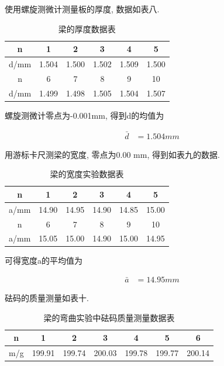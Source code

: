 \documentclass[a4paper,10pt,notitlepage]{article}
\begin{document}
	使用螺旋测微计测量板的厚度, 数据如表八. \\
	
\begin{center}

	\begin{longtable}{|c|c|c|c|c|c|}
	\caption{梁的厚度数据表} \\
	\hline
	n & 1 & 2 & 3 & 4 & 5 \\
	\hline
	d/mm & 1.504 & 1.500 & 1.502 & 1.509 & 1.500 \\
	\hline
	\hline
	n & 6 & 7 & 8 & 9 & 10 \\
	\hline
	d/mm & 1.499 & 1.498 & 1.505 & 1.504 & 1.507 \\
	\hline
	\end{longtable}

\end{center}

	螺旋测微计零点为-0.001mm, 得到d的均值为
	
\begin{align*}
	\bar{d} &= 1.504 mm
\end{align*}

	用游标卡尺测梁的宽度, 零点为0.00 mm, 得到如表九的数据. \\
	
\begin{center}

	\begin{longtable}{|c|c|c|c|c|c|}
	\caption{梁的宽度实验数据表} \\
	\hline
	n & 1 & 2 & 3 & 4 & 5 \\
	\hline
	a/mm & 14.90 & 14.95 & 14.90 & 14.85 & 15.00 \\
	\hline
	\hline
	n & 6 & 7 & 8 & 9 & 10 \\
	\hline
	a/mm & 15.05 & 15.00 & 14.90 & 15.00 & 14.95 \\
	\hline
	\end{longtable}

\end{center}

	可得宽度a的平均值为

\begin{align*}
	\bar{a} &= 14.95 mm
\end{align*}

	砝码的质量测量如表十. \\
	
\begin{center}

	\begin{longtable}{|c|c|c|c|c|c|c|}
	\caption{梁的弯曲实验中砝码质量测量数据表} \\
	\hline
	n & 1 & 2 & 3 & 4 & 5 & 6 \\
	\hline
	m/g & 199.91 & 199.74 & 200.03 & 199.78 & 199.77 & 200.14 \\
	\hline
	\end{longtable}

\end{center}
\end{document}
